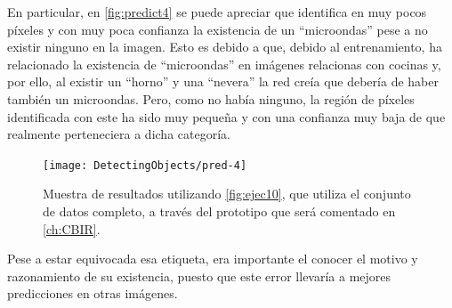 \newpage
En particular, en \autoref{fig:predict4} se puede apreciar que identifica en muy pocos píxeles y con muy poca confianza la existencia de un ``microondas'' pese a no existir ninguno en la imagen. Esto es debido a que, debido al entrenamiento, ha relacionado la existencia de ``microondas'' en imágenes relacionas con cocinas y, por ello, al existir un ``horno'' y una ``nevera'' la red creía que debería de haber también un microondas. Pero, como no había ninguno, la región de píxeles identificada con este ha sido muy pequeña y con una confianza muy baja de que realmente perteneciera a dicha categoría. \\

\begin{figure}[h!]
  \centering
  \texttt{[image: DetectingObjects/pred-4]}
  \caption{Muestra de resultados utilizando \autoref{fig:ejec10}, que utiliza el conjunto de datos completo, a través del prototipo que será comentado en \autoref{ch:CBIR}.}
  \label{fig:predict4}
\end{figure}

Pese a estar equivocada esa etiqueta, era importante el conocer el motivo y razonamiento de su existencia, puesto que este error llevaría a mejores predicciones en otras imágenes.\\

